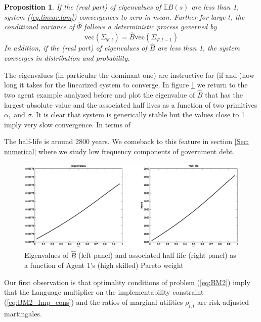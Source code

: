 \documentclass[thmsb,11pt]{article}
\newtheorem{proposition}{Proposition}
\begin{document}
\begin{proposition}\label{prop: localstability}
If the (real part) of eigenvalues of $\mathbb{E}B(s)$ are less than 1,  system (\ref{eq.linear.lom}) convergences to zero  in mean. Further for large $t$, the conditional variance of $\hat{\Psi}$ follows a deterministic process governed by 
\[\text{vec}(\Sigma_{\Psi,t})=\hat{B} \text{vec}(\Sigma_{\Psi,t-1})\]	
In addition,  if the (real part) of eigenvalues of $\hat{B}$ are less than 1, the system converges in distribution and probability.
\end{proposition}

The eigenvalues (in particular the dominant one) are instructive for (if and )how long it takes for the linearized system to converge. In figure \ref{fig: Eigenvalues} we return to the two agent example analyzed before and plot the eigenvalue of $\hat{B}$ that has the largest absolute value  and the associated half lives as a function of two primitives$\alpha_1$ and $\sigma$. It is clear that system is generically stable but the values close to 1 imply very slow convergence. In terms of 


The half-life is around 2800 years. We comeback to this feature in section \ref{Sec: numerical} where we study low frequency components of government debt.


  \begin{figure}[htp]
 \centering
 \includegraphics[width=\textwidth]{Draft25Graphs/eigenvalues_alpha1.eps}
 \caption{Eigenvalues of $\hat{B}$ (left panel) and associated half-life (right panel) as a function of Agent 1's (high skilled) Pareto weight}
 \label{fig: Eigenvalues}
 \end{figure}




Our first observation is that optimality conditions of problem (\ref{eq:BM2}) imply that the Language multiplier on the implementability constraint (\ref{eq:BM2_Imp_cons}) and the ratios of marginal utilities $\rho_{i,t}$ are risk-adjusted martingales. 
\end{document}
